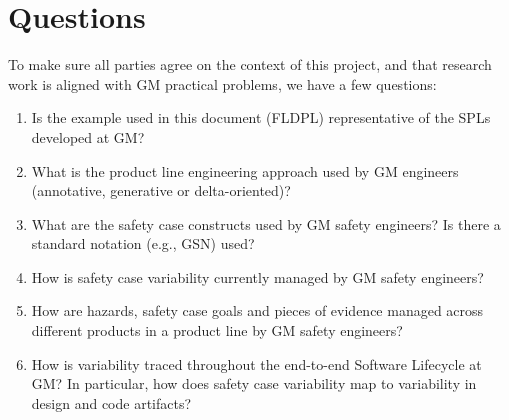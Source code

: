 \documentclass[11pt]{article}
\begin{document}
\section{Questions}

To make sure all parties agree on the context of this project, and that research work is aligned with GM practical problems, we have a few questions:

\begin{enumerate}

\item Is the example used in this document (FLDPL) representative of the SPLs developed at GM?

\item What is the product line engineering approach used by GM engineers (annotative, generative or delta-oriented)?

\item What are the safety case constructs used by GM safety engineers? Is there a standard notation (e.g., GSN) used?

\item How is safety case variability currently managed by GM safety engineers? 

\item How are hazards, safety case goals and pieces of evidence managed across different products in a product line by GM safety engineers?

\item How is variability traced throughout the end-to-end Software Lifecycle at GM? In particular, how does safety case variability map to variability in design and code artifacts?

\end{enumerate}
 
\end{document}

